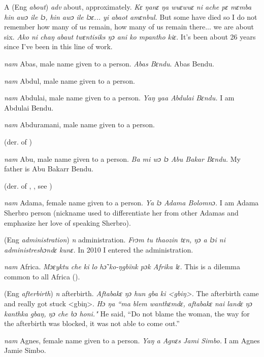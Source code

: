\begin{letter}{A}
 (Eng \textit{about}) \textit{adv} about, approximately. \textit{Kɛ ŋanɛ ŋa wuɛwuɛ ni ache pɛ mɛmba hin awɔ ile lɔ, hin awɔ ile lɔɛ... yi abaot amɛnbul.} But some have died so I do not remember how many of us remain, how many of us remain there... we are about six. \textit{Ako ni chaŋ abaut twɛntisiks ŋɔ ani ko mpantho kiɛ.} It's been about 26 years since I've been in this line of work.

 \textit{nam} Abas, male name given to a person. \textit{Abas Bɛndu}. Abas Bendu.

 \textit{nam} Abdul, male name given to a person.

 \textit{nam} Abdulai, male name given to a person. \textit{Yaŋ yaa Abdulai Bɛndu.} I am Abdulai Bendu.

 \textit{nam} Abduramani, male name given to a person.

 (der. of ) 

 \textit{nam} Abu, male name given to a person. \textit{Ba mi wɔ lɔ Abu Bakar Bɛndu.} My father is Abu Bakarr Bendu.

 (der. of , , see ) 

 \textit{nam} Adama, female name given to a person. \textit{Ya lɔ Adama Bolomnɔ.} I am Adama Sherbro person (nickname used to differentiate her from other Adamas and emphasize her love of speaking Sherbro). 

 (Eng \textit{administration}) \textit{n} administration. \textit{Frɔm tu thaozin tɛn, ŋɔ a lɔi ni administreshɔndɛ kunɛ.} In 2010 I entered the administration.

 \textit{nam} Africa. \textit{Mɔɛyktu che ki lo hɔ̃ ko-ŋgbïnk pɔk Afrika lɛ.} This is a dilemma common to all Africa (\citealt{Pichl1967}). 

 (Eng \textit{afterbirth}) \textit{n} afterbirth. \textit{Aftabakɛ ŋɔ hun gba ki <gbiŋ>.} The afterbirth came and really got stuck <gbiŋ>. \textit{Hɔ ŋa “ma blem wanthɛmdɛ, aftabakɛ nai landɛ ŋɔ kanthka gbaŋ, ŋɔ che bɔ honi."} He said, “Do not blame the woman, the way for the afterbirth was blocked, it was not able to come out.”

 \textit{nam} Agnes, female name given to a person. \textit{Yaŋ a Agnɛs Jami Simbo.} I am Agnes Jamie Simbo.


\end{letter}
